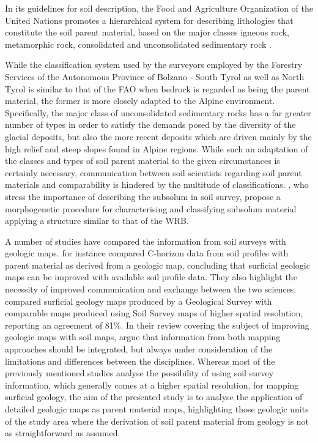 \documentclass[preprint,12pt,authoryear]{elsarticle}
\begin{document}
In its guidelines for soil description, the Food and Agriculture Organization of the United Nations promotes a hierarchical system for describing lithologies that constitute the soil parent material, based on the major classes igneous rock, metamorphic rock, consolidated and unconsolidated sedimentary rock \citep{FAO2006}.

While the classification system used by the surveyors employed by the Forestry Services of the Autonomous Province of Bolzano - South Tyrol as well as North Tyrol \citep{Englisch1998, waldtypisierungTirol} is similar to that of the FAO when bedrock is regarded as being the parent material, the former is more closely adapted to the Alpine environment. Specifically, the major class of unconsolidated sedimentary rocks has a far greater number of types in order to satisfy the demands posed by the diversity of the glacial deposits, but also the more recent deposits which are driven mainly by the high relief and steep slopes found in Alpine regions.
While such an adaptation of the classes and types of soil parent material to the given circumstances is certainly necessary, communication between soil scientists regarding soil parent materials and comparability is hindered by the multitude of classifications. \cite{Juilleret2016}, who stress the importance of describing the subsolum in soil survey, propose a morphogenetic procedure for characterising and classifying subsolum material applying a structure similar to that of the WRB. 

A number of studies have compared the information from soil surveys with geologic maps. \cite{Juilleret2012} for instance compared  C-horizon data from soil profiles with parent material as derived from a geologic map, concluding that surficial geologic maps can be improved with available soil profile data. They also highlight the necessity of improved communication and exchange between the two sciences.  \cite{Miller2015a} compared surficial geology maps produced by a Geological Survey with comparable maps produced using Soil Survey maps of higher spatial resolution, reporting an agreement of 81\%. In their review covering the subject of improving geologic maps with soil maps, \cite{Brevik2015} argue that information from both mapping approaches should be integrated, but always under consideration of the limitations and differences between the disciplines. Whereas most of the previously mentioned studies analyse the possibility of using soil survey information, which generally comes at a higher spatial resolution, for mapping surficial geology, the aim of the presented study is to analyse the application of detailed geologic maps as parent material maps, highlighting those geologic units of the study area where the derivation of soil parent material from geology is not as straightforward as assumed.
\end{document}
